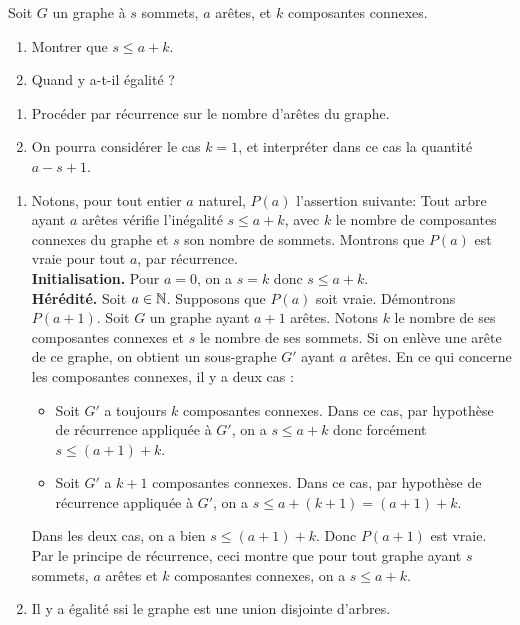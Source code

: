 

\begin{exo}
Soit $G$ un graphe à $s$ sommets,  $a$ arêtes, et $k$ composantes connexes.
\begin{enumerate}
\item Montrer que $s \leq a+k$. 
\item Quand y a-t-il égalité ? 
\end{enumerate}
\begin{hint}
\begin{enumerate}
\item Procéder par récurrence sur le nombre d'arêtes du graphe.
\item On pourra considérer le cas $k=1$, et  interpréter dans ce cas la quantité $a-s+1$.%
\end{enumerate}
\end{hint}
\begin{sol}
\begin{enumerate}
\item Notons, pour tout entier $a$ naturel, $P(a)$ l'assertion suivante: \og Tout arbre ayant $a$ arêtes vérifie l'inégalité $s \leq a+k$, avec $k$ le nombre de composantes connexes du graphe et $s$ son nombre de sommets.\fg{} Montrons que $P(a)$ est vraie pour tout $a$, par récurrence.\\
\textbf{Initialisation.} Pour $a=0$, on a $s=k$ donc $s\leq a+k$.\\
\textbf{Hérédité.} Soit $a\in \mathbb N$. Supposons que $P(a)$ soit vraie. Démontrons $P(a+1)$.  Soit $G$ un graphe ayant $a+1$ arêtes. Notons $k$ le nombre de ses composantes connexes et $s$ le nombre de ses sommets. Si on enlève une arête de ce graphe, on obtient un sous-graphe $G'$ ayant $a$ arêtes. En ce qui concerne les composantes connexes, il y a deux cas :
\begin{itemize}
\item Soit $G'$ a toujours $k$ composantes connexes. Dans ce cas, par hypothèse de récurrence appliquée à $G'$, on a  $s\leq a+k$ donc forcément  $s\leq (a+1)+k$.
\item Soit $G'$ a $k+1$ composantes connexes. Dans ce cas, par hypothèse de récurrence appliquée à $G'$, on a $s \leq a+ (k+1) = (a+1)+k$.
\end{itemize}
Dans les deux cas, on a bien $s\leq (a+1)+k$. Donc $P(a+1)$ est vraie.\\
Par le principe de récurrence, ceci montre que pour tout graphe ayant $s$ sommets, $a$ arêtes et $k$ composantes connexes, on a $s\leq a+k$.
\item Il y a égalité ssi le graphe est une union disjointe d'arbres.
\end{enumerate}
\end{sol}
\end{exo}

